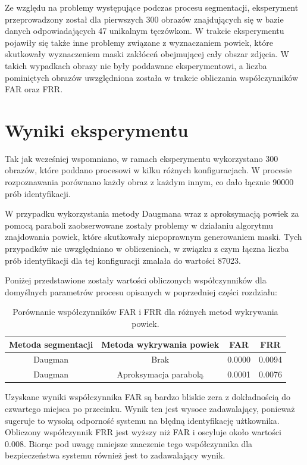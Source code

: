 \documentclass[10pt,polish,a4paper,oneside]{ppfcmthesis}
\begin{document}
Ze względu na problemy występujące podczas procesu segmentacji, eksperyment przeprowadzony został dla pierwszych
300 obrazów znajdujących się w bazie danych odpowiadających 47 unikalnym tęczówkom. W trakcie eksperymentu
pojawiły się także inne problemy związane z wyznaczaniem powiek, które skutkowały wyznaczeniem maski zakłóceń
obejmującej cały obszar zdjęcia. W takich wypadkach obrazy nie były poddawane eksperymentowi, a liczba pominiętych
obrazów uwzględniona została w trakcie obliczania współczynników FAR oraz FRR.

\section{Wyniki eksperymentu}

Tak jak wcześniej wspomniano, w ramach eksperymentu wykorzystano 300 obrazów, które poddano procesowi
w kilku różnych konfiguracjach. W procesie rozpoznawania porównano każdy obraz z każdym innym, co dało
łącznie 90000 prób identyfikacji.

W przypadku wykorzystania metody Daugmana wraz z aproksymacją powiek za pomocą paraboli zaobserwowane
zostały problemy w działaniu algorytmu znajdowania powiek, które skutkowały niepoprawnym generowaniem maski.
Tych przypadków nie uwzględniano w obliczeniach, w związku z czym łączna liczba prób identyfikacji dla tej
konfiguracji zmalała do wartości 87023.\newline

\noindent
Poniżej przedstawione zostały wartości obliczonych współczynników dla domyślnych parametrów
procesu opisanych w poprzedniej części rozdziału:

\begin{table}[ht]
  \centering
  \begin{tabular}{c|c|c|c}
    \rowcolor{gray!20}
    Metoda segmentacji & Metoda wykrywania powiek & FAR & FRR \\
    \hline\hline
    Daugman & Brak & 0.0000 & 0.0094 \\
    \hline
    Daugman & Aproksymacja parabolą & 0.0001 & 0.0076 \\
  \end{tabular}
  \caption{Porównanie współczynników FAR i FRR dla różnych metod wykrywania powiek.}
\end{table}

Uzyskane wyniki współczynnika FAR są bardzo bliskie zera z dokładnością do czwartego miejsca
po przecinku. Wynik ten jest wysoce zadawalający, ponieważ sugeruje to wysoką odpornoś\'c systemu
na błędną identyfikację użtkownika. Obliczony współczynnik FRR jest wyższy niż FAR i oscyluje
około wartości 0.008. Biorąc pod uwagę mniejsze znaczenie tego współczynnika dla bezpieczeństwa
systemu również jest to zadawalający wynik.\newline
\end{document}
